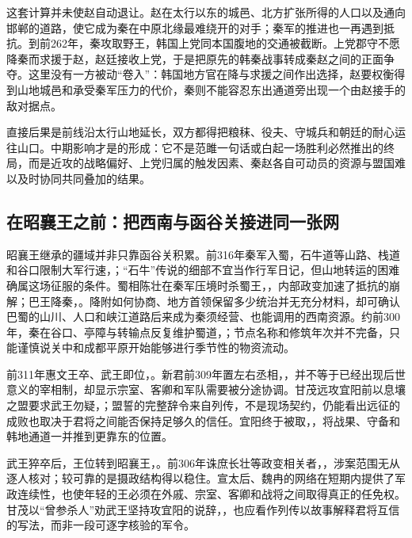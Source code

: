 这套计算并未使赵自动退让。赵在太行以东的城邑、北方扩张所得的人口以及通向邯郸的道路，使它成为秦在中原北缘最难绕开的对手；秦军的推进也一再遇到抵抗。到前262年，秦攻取野王，韩国上党同本国腹地的交通被截断。上党郡守不愿降秦而求援于赵，赵廷接收上党，于是把原先的韩秦战事转成秦赵之间的正面争夺。这里没有一方被动“卷入”：韩国地方官在降与求援之间作出选择，赵要权衡得到山地城邑和承受秦军压力的代价，秦则不能容忍东出通道旁出现一个由赵接手的敌对据点。

直接后果是前线沿太行山地延长，双方都得把粮秣、役夫、守城兵和朝廷的耐心运往山口。中期影响才是的形成：它不是范雎一句话或白起一场胜利必然推出的终局，而是近攻的战略偏好、上党归属的触发因素、秦赵各自可动员的资源与盟国难以及时协同共同叠加的结果。

\subsection{在昭襄王之前：把西南与函谷关接进同一张网}

昭襄王继承的疆域并非只靠函谷关积累。前316年秦军入蜀，石牛道等山路、栈道和谷口限制大军行速，；“石牛”传说的细部不宜当作行军日记，但山地转运的困难确属这场征服的条件。蜀相陈壮在秦军压境时杀蜀王，，内部政变加速了抵抗的崩解；巴王降秦，。降附如何协商、地方首领保留多少统治并无充分材料，却可确认巴蜀的山川、人口和峡江道路后来成为秦须经营、也能调用的西南资源。约前300年，秦在谷口、亭障与转输点反复维护蜀道，；节点名称和修筑年次并不完备，只能谨慎说关中和成都平原开始能够进行季节性的物资流动。

前311年惠文王卒、武王即位，。新君前309年置左右丞相，，并不等于已经出现后世意义的宰相制，却显示宗室、客卿和军队需要被分途协调。甘茂远攻宜阳前以息壤之盟要求武王勿疑，；盟誓的完整辞令来自列传，不是现场契约，仍能看出远征的成败也取决于君将之间能否保持足够久的信任。宜阳终于被取，，将战果、守备和韩地通道一并推到更靠东的位置。

武王猝卒后，王位转到昭襄王，。前306年诛庶长壮等政变相关者，，涉案范围无从逐人核对；较可靠的是摄政结构得以稳住。宣太后、魏冉的网络在短期内提供了军政连续性，也使年轻的王必须在外戚、宗室、客卿和战将之间取得真正的任免权。甘茂以“曾参杀人”劝武王坚持攻宜阳的说辞，，也应看作列传以故事解释君将互信的写法，而非一段可逐字核验的军令。

